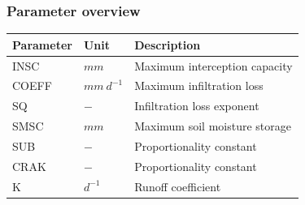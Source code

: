 \subsubsection{Parameter overview}
\begin{table}[htbp]
  \centering
    \begin{tabular}{lll}
    \toprule
    Parameter & Unit  & Description \\
    \midrule
    INSC  & $mm$  & Maximum interception capacity \\
    COEFF & $mm~d^{-1}$ & Maximum infiltration loss \\
    SQ    & $-$   & Infiltration loss exponent \\
    SMSC  & $mm$  & Maximum soil moisture storage \\
    SUB   & $-$   & Proportionality constant \\
    CRAK  & $-$   & Proportionality constant \\
    K     & $d^{-1}$ & Runoff coefficient \\
    \bottomrule
    \end{tabular}%
  \label{tab:addlabel}%
\end{table}%



